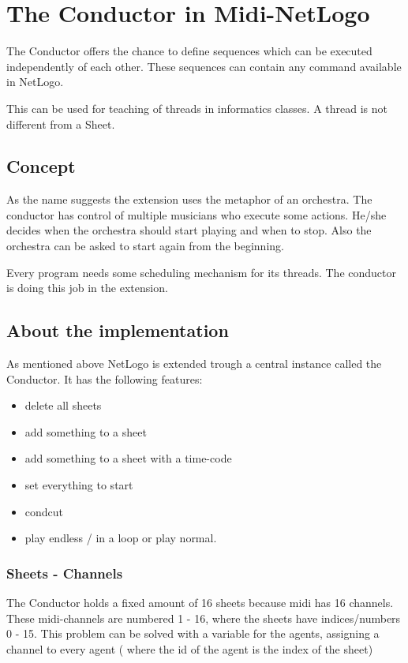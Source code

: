 \documentclass[10pt,a4paper]{article}
\begin{document}
\section{The Conductor in Midi-NetLogo}
The Conductor offers the chance to define sequences which can be executed independently of each other.
These sequences can contain any command available in NetLogo. 

This can be used for teaching of threads in informatics classes. A thread is not
different from a Sheet.  

\subsection{Concept}
As the name suggests the extension uses the metaphor of an orchestra. The conductor has 
control of multiple musicians who execute some actions. He/she decides when the
orchestra should start playing and when to stop. Also the orchestra can be asked to
start again from the beginning. 

Every program needs some scheduling mechanism for its threads. The conductor is doing
this job in the extension. 

\subsection{About the implementation}
As mentioned above NetLogo is extended trough a central instance called the Conductor. 
It has the following features: \begin{itemize}
\item delete all sheets
\item add something to a sheet
\item add something to a sheet with a time-code
\item set everything to start
\item condcut
\item play endless / in a loop or play normal. 
\end{itemize}

\subsubsection{Sheets - Channels}\label{sec:sheet-channel}
The Conductor holds a fixed amount of 16 sheets because midi has 16 channels.
These midi-channels are numbered 1 - 16, where the sheets have indices/numbers 0 - 15.
This problem can be solved with a variable for the agents, assigning a channel to every agent (
where the id of the agent is the index of the sheet)
\end{document}
